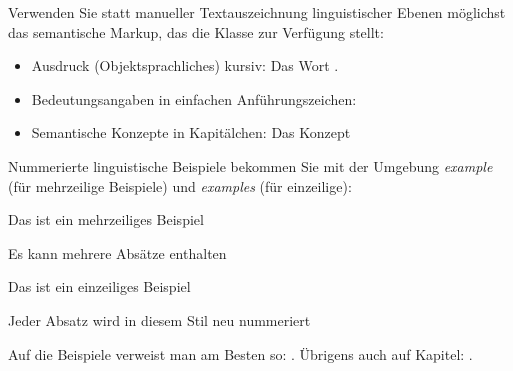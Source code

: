 \documentclass[naustrian,pdfa]{univie-ling-thesis}
\begin{document}
Verwenden Sie statt manueller Textauszeichnung linguistischer Ebenen möglichst das semantische Markup, das die Klasse zur Verfügung stellt:
\begin{itemize}
	\item Ausdruck (Objektsprachliches) kursiv: Das Wort .
	\item Bedeutungsangaben in einfachen Anführungszeichen: 
	\item Semantische Konzepte in Kapitälchen: Das Konzept 
\end{itemize}
%
Nummerierte linguistische Beispiele bekommen Sie mit der Umgebung \emph{example} (für mehrzeilige Beispiele) und \emph{examples} (für einzeilige):

\begin{example}
	Das ist ein mehrzeiliges Beispiel
	
	Es kann mehrere Absätze enthalten
\end{example}

\begin{examples}
	\item Das ist ein einzeiliges Beispiel\label{exa:Beispiel-einzeilig}
	\item Jeder Absatz wird in diesem Stil neu nummeriert
\end{examples}
%
Auf die Beispiele verweist man am Besten so: . Übrigens auch auf Kapitel: .

\printbibliography[heading=bibnumbered]
\end{document}
